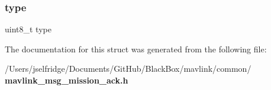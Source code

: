 \mbox{\label{struct____mavlink__mission__ack__t_a1d127017fb298b889f4ba24752d08b8e}} 
\subsubsection{type}
{\footnotesize\ttfamily uint8\+\_\+t type}



The documentation for this struct was generated from the following file\+:\begin{DoxyCompactItemize}
\item 
/\+Users/jselfridge/\+Documents/\+Git\+Hub/\+Black\+Box/mavlink/common/\textbf{ mavlink\+\_\+msg\+\_\+mission\+\_\+ack.\+h}\end{DoxyCompactItemize}
